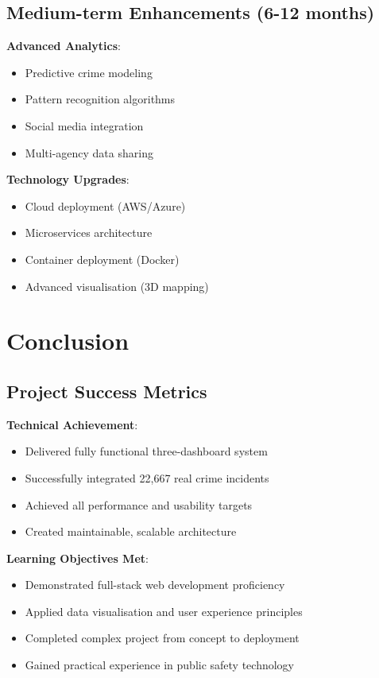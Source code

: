 \documentclass[12pt,a4paper]{article}
\begin{document}
\subsection{Medium-term Enhancements (6-12 months)}

\textbf{Advanced Analytics}:
\begin{itemize}
    \item Predictive crime modeling
    \item Pattern recognition algorithms
    \item Social media integration
    \item Multi-agency data sharing
\end{itemize}

\textbf{Technology Upgrades}:
\begin{itemize}
    \item Cloud deployment (AWS/Azure)
    \item Microservices architecture
    \item Container deployment (Docker)
    \item Advanced visualisation (3D mapping)
\end{itemize}

\section{Conclusion}

\subsection{Project Success Metrics}

\textbf{Technical Achievement}:
\begin{itemize}
    \item[\checkmark] Delivered fully functional three-dashboard system
    \item[\checkmark] Successfully integrated 22,667 real crime incidents
    \item[\checkmark] Achieved all performance and usability targets
    \item[\checkmark] Created maintainable, scalable architecture
\end{itemize}

\textbf{Learning Objectives Met}:
\begin{itemize}
    \item[\checkmark] Demonstrated full-stack web development proficiency
    \item[\checkmark] Applied data visualisation and user experience principles
    \item[\checkmark] Completed complex project from concept to deployment
    \item[\checkmark] Gained practical experience in public safety technology
\end{itemize}
\end{document}
